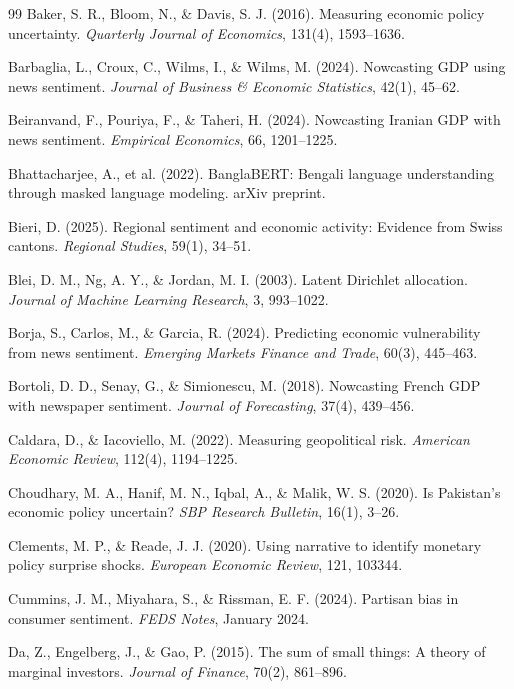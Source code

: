 \documentclass[11pt]{article}
\begin{document}
{{\begin{thebibliography}{99}
 Baker, S. R., Bloom, N., \& Davis, S. J. (2016). Measuring economic policy uncertainty. \textit{Quarterly Journal of Economics}, 131(4), 1593--1636.

 Barbaglia, L., Croux, C., Wilms, I., \& Wilms, M. (2024). Nowcasting GDP using news sentiment. \textit{Journal of Business \& Economic Statistics}, 42(1), 45--62.

 Beiranvand, F., Pouriya, F., \& Taheri, H. (2024). Nowcasting Iranian GDP with news sentiment. \textit{Empirical Economics}, 66, 1201--1225.

 Bhattacharjee, A., et al. (2022). BanglaBERT: Bengali language understanding through masked language modeling. arXiv preprint.

 Bieri, D. (2025). Regional sentiment and economic activity: Evidence from Swiss cantons. \textit{Regional Studies}, 59(1), 34--51.

 Blei, D. M., Ng, A. Y., \& Jordan, M. I. (2003). Latent Dirichlet allocation. \textit{Journal of Machine Learning Research}, 3, 993--1022.

 Borja, S., Carlos, M., \& Garcia, R. (2024). Predicting economic vulnerability from news sentiment. \textit{Emerging Markets Finance and Trade}, 60(3), 445--463.

 Bortoli, D. D., Senay, G., \& Simionescu, M. (2018). Nowcasting French GDP with newspaper sentiment. \textit{Journal of Forecasting}, 37(4), 439--456.

 Caldara, D., \& Iacoviello, M. (2022). Measuring geopolitical risk. \textit{American Economic Review}, 112(4), 1194--1225.

 Choudhary, M. A., Hanif, M. N., Iqbal, A., \& Malik, W. S. (2020). Is Pakistan's economic policy uncertain? \textit{SBP Research Bulletin}, 16(1), 3--26.

 Clements, M. P., \& Reade, J. J. (2020). Using narrative to identify monetary policy surprise shocks. \textit{European Economic Review}, 121, 103344.

 Cummins, J. M., Miyahara, S., \& Rissman, E. F. (2024). Partisan bias in consumer sentiment. \textit{FEDS Notes}, January 2024.

 Da, Z., Engelberg, J., \& Gao, P. (2015). The sum of small things: A theory of marginal investors. \textit{Journal of Finance}, 70(2), 861--896.


\end{thebibliography}}}
\end{document}
